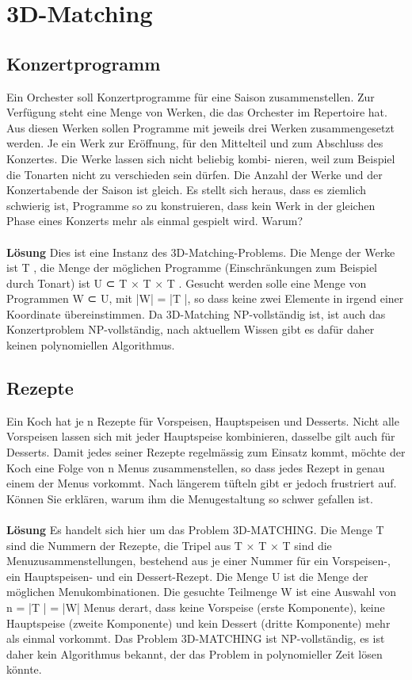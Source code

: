 \section{3D-Matching}
\subsection{Konzertprogramm}
Ein Orchester soll Konzertprogramme für eine Saison zusammenstellen. Zur Verfügung steht eine Menge von Werken, die das Orchester im Repertoire hat. Aus diesen Werken sollen Programme mit jeweils drei Werken zusammengesetzt werden. Je ein Werk zur Eröffnung, für den Mittelteil und zum Abschluss des Konzertes. Die Werke lassen sich nicht beliebig kombi- nieren, weil zum Beispiel die Tonarten nicht zu verschieden sein dürfen. Die Anzahl der Werke und der Konzertabende der Saison ist gleich. Es stellt sich heraus, dass es ziemlich schwierig ist, Programme so zu konstruieren, dass kein Werk in der gleichen Phase eines Konzerts mehr als einmal gespielt wird. Warum?\\
\\
\textbf{Lösung}
Dies ist eine Instanz des 3D-Matching-Problems. Die Menge der Werke ist T , die Menge der möglichen Programme (Einschränkungen zum Beispiel durch Tonart) ist U ⊂ T × T × T . Gesucht werden solle eine Menge von Programmen W ⊂ U, mit |W| = |T |, so dass keine zwei Elemente in irgend einer Koordinate übereinstimmen. Da 3D-Matching NP-vollständig ist, ist auch das Konzertproblem NP-vollständig, nach aktuellem Wissen gibt es dafür daher keinen polynomiellen Algorithmus.
\subsection{Rezepte}
Ein Koch hat je n Rezepte für Vorspeisen, Hauptspeisen und Desserts. Nicht alle Vorspeisen lassen sich mit jeder Hauptspeise kombinieren, dasselbe gilt auch für Desserts. Damit jedes seiner Rezepte regelmässig zum Einsatz kommt, möchte der Koch eine Folge von n Menus zusammenstellen, so dass jedes Rezept in genau einem der Menus vorkommt. Nach längerem tüfteln gibt er jedoch frustriert auf. Können Sie erklären, warum ihm die Menugestaltung so schwer gefallen ist.\\
\\
\textbf{Lösung}
Es handelt sich hier um das Problem 3D-MATCHING. Die Menge T sind die Nummern der Rezepte, die Tripel aus 
T × T × T sind die Menuzusammenstellungen, bestehend aus je einer Nummer für ein Vorspeisen-, ein Hauptspeisen- und ein Dessert-Rezept. Die Menge U ist die Menge der möglichen Menukombinationen. Die gesuchte Teilmenge W ist eine Auswahl von n = |T | = |W| Menus derart, dass keine Vorspeise (erste Komponente), keine Hauptspeise (zweite Komponente) und kein Dessert (dritte Komponente) mehr als einmal vorkommt. Das Problem 3D-MATCHING ist NP-vollständig, es ist daher kein Algorithmus bekannt, der das Problem in polynomieller Zeit lösen könnte.
